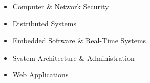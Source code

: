 \begin{itemize}
\item Computer \& Network Security
\item Distributed Systems
\item Embedded Software \& Real-Time Systems
\item System Architecture \& Administration
\item Web Applications
\end{itemize}
